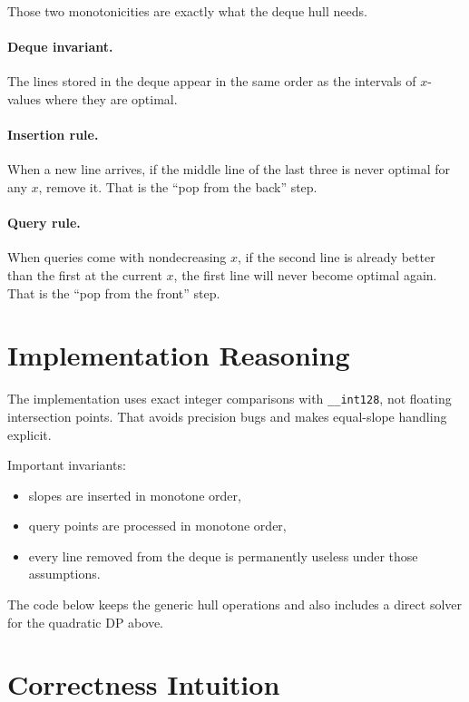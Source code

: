 Those two monotonicities are exactly what the deque hull needs.

\paragraph{Deque invariant.}
The lines stored in the deque appear in the same order as the intervals of \(x\)-values where they are optimal.

\paragraph{Insertion rule.}
When a new line arrives, if the middle line of the last three is never optimal for any \(x\), remove it. That is the
``pop from the back'' step.

\paragraph{Query rule.}
When queries come with nondecreasing \(x\), if the second line is already better than the first at the current \(x\),
the first line will never become optimal again. That is the ``pop from the front'' step.

\section*{Implementation Reasoning}

The implementation uses exact integer comparisons with \texttt{\_\_int128}, not floating intersection points. That
avoids precision bugs and makes equal-slope handling explicit.

Important invariants:

\begin{itemize}
  \item slopes are inserted in monotone order,
  \item query points are processed in monotone order,
  \item every line removed from the deque is permanently useless under those assumptions.
\end{itemize}

The code below keeps the generic hull operations and also includes a direct solver for the quadratic DP above.

\section*{Correctness Intuition}

